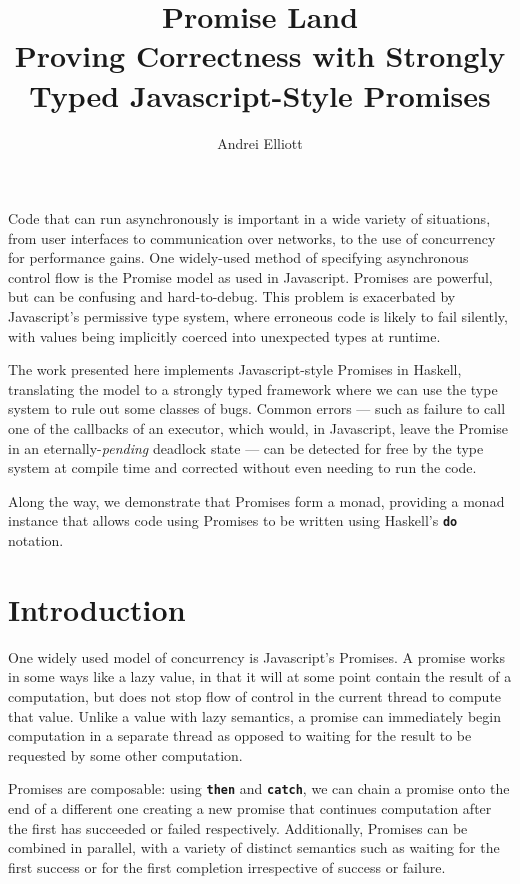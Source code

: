 \documentclass[12pt, english, letterpaper]{kuthesis}
\title{Promise Land\\
\smaller Proving Correctness with Strongly Typed Javascript-Style Promises}
\author{Andrei Elliott}
\newcommand{\lit}[1]{\textbf{\texttt{#1}}}
\begin{document}
\begin{romanpages}
  \maketitle
  \begin{abstractlong}
    Code that can run asynchronously is important in a wide variety of situations, from user interfaces to communication over networks, to the use of concurrency for performance gains.  One widely-used method of specifying asynchronous control flow is the \textsf{Promise} model as used in Javascript.  \textsf{Promises} are powerful, but can be confusing and hard-to-debug.  This problem is exacerbated by Javascript’s permissive type system, where erroneous code is likely to fail silently, with values being implicitly coerced into unexpected types at runtime.

The work presented here implements Javascript-style \textsf{Promises} in Haskell, translating the model to a strongly typed framework where we can use the type system to rule out some classes of bugs.  Common errors --- such as failure to call one of the callbacks of an executor, which would, in Javascript, leave the \textsf{Promise} in an eternally-\emph{pending} deadlock state --- can be detected for free by the type system at compile time and corrected without even needing to run the code.

Along the way, we demonstrate that \textsf{Promises} form a monad, providing a monad instance that allows code using \textsf{Promises} to be written using Haskell’s \lit{do} notation.
  \end{abstractlong}
\end{romanpages}

\chapter*{Introduction}
One widely used model of concurrency is Javascript's Promises.  A promise works in some ways like a lazy value, in that it will at some point contain the result of a computation, but does not stop flow of control in the current thread to compute that value.  Unlike a value with lazy semantics, a promise can immediately begin computation in a separate thread as opposed to waiting for the result to be requested by some other computation.

Promises are composable: using \lit{then} and \lit{catch}, we can chain a promise onto the end of a different one creating a new promise that continues computation after the first has succeeded or failed respectively.  Additionally, \textsf{Promises} can be combined in parallel, with a variety of distinct semantics such as waiting for the first success or for the first completion irrespective of success or failure.
\end{document}
